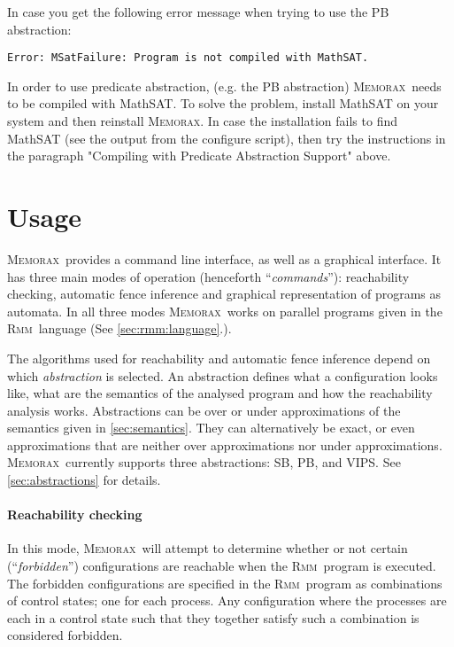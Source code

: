 \documentclass[a4paper]{article}
\newcommand{\memorax}{\textsc{Memorax}}
\newcommand{\rmm}{\textsc{Rmm}}
\begin{document}
   In case you get the following error message when trying to use the
   PB abstraction:

\begin{verbatim}
Error: MSatFailure: Program is not compiled with MathSAT.
\end{verbatim}

   In order to use predicate abstraction, (e.g. the PB abstraction)
   \memorax\ needs to be compiled with MathSAT. To solve the problem,
   install MathSAT on your system and then reinstall \memorax. In case
   the installation fails to find MathSAT (see the output from the
   configure script), then try the instructions in the paragraph
   "Compiling with Predicate Abstraction Support" above.

\section{Usage}\label{sec:usage}

\memorax\ provides a command line interface, as well as a graphical
interface. It has three main modes of operation (henceforth
``\emph{commands}''): reachability checking, automatic fence inference
and graphical representation of programs as automata. In all three
modes \memorax\ works on parallel programs given in the \rmm\ language
(See \cref{sec:rmm:language}.).

The algorithms used for reachability and automatic fence inference
depend on which \emph{abstraction} is selected. An abstraction defines
what a configuration looks like, what are the semantics of the
analysed program and how the reachability analysis works. Abstractions
can be over or under approximations of the semantics given in
\cref{sec:semantics}. They can alternatively be exact, or even
approximations that are neither over approximations nor under
approximations. \memorax\ currently supports three abstractions: SB,
PB, and VIPS. See \cref{sec:abstractions} for details.

\paragraph{Reachability checking}
 In this mode, \memorax\ will attempt to determine whether or not
 certain (``\emph{forbidden}'') configurations are reachable when the
 \rmm\ program is executed. The forbidden configurations are specified
 in the \rmm\ program as combinations of control states; one for each
 process. Any configuration where the processes are each in a control
 state such that they together satisfy such a combination is
 considered forbidden.
\end{document}
